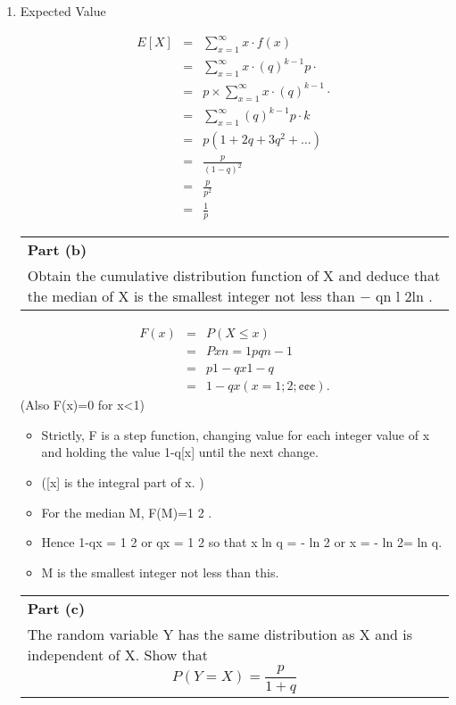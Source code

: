 \documentclass[a4paper,12pt]{article}
\begin{document}
\begin{enumerate}
    \item Expected Value


\begin{eqnarray*}
E[X] &=&
\sum_{x=1}^{\infty } x \cdot f(x)   
\\&=&
\sum_{x=1}^{\infty } x \cdot(q)^{k-1}p\cdot   
\\&=&
p \times \sum_{x=1}^{\infty } x \cdot(q)^{k-1}\cdot   
\\&=&
\sum_{x=1}^{\infty }(q)^{k-1}p\cdot k \\&=& p(1 + 2q + 3q^2 + \ldots)
\\&=& \frac{p}{(1 -  q)^2} \\&=& \frac{p}{p^2} \\&=& \frac{1}{p} 
\end{eqnarray*}
 \begin{table}[ht!]
     \centering
     \begin{tabular}{|p{15cm}|}
     \hline        
 \noindent \textbf{Part (b)}\\
\noindent Obtain the cumulative distribution function of X and deduce that the median of X is the
smallest integer not less than − 
qn l 2ln
 .

\\ \hline
 \end{tabular}
\end{table}

\begin{eqnarray*}
F(x)&=&P(X \leq x)\\&=&
Px
n=1
pqn- 1 \\&=&  p1- qx
1- q \\&=& 1 -  qx (x = 1; 2; ¢ ¢ ¢) .
\end{eqnarray*}
(Also F(x)=0 for x<1)
\begin{itemize}
    \item Strictly, F is a step function, changing value for each integer value of x and holding the value
1-q[x] until the next change.
\item ([x] is the integral part of x. )
\item For the median M, F(M)=1
2 .

\item Hence 1-qx = 1
2 or qx = 1
2 so that x ln q = - ln 2 or x = - ln 2= ln q. 
\item M is the smallest integer not
less than this.
\end{itemize}

\begin{table}[ht!]
     \centering
     \begin{tabular}{|p{15cm}|}
     \hline        
 \noindent \textbf{Part (c)}\\
\noindent The random variable Y has the same distribution as X and is independent of X. Show that
\[P(Y = X) =  \frac{p}{1+q}\]



\end{tabular}
\end{table}
\end{enumerate}
\end{document}
